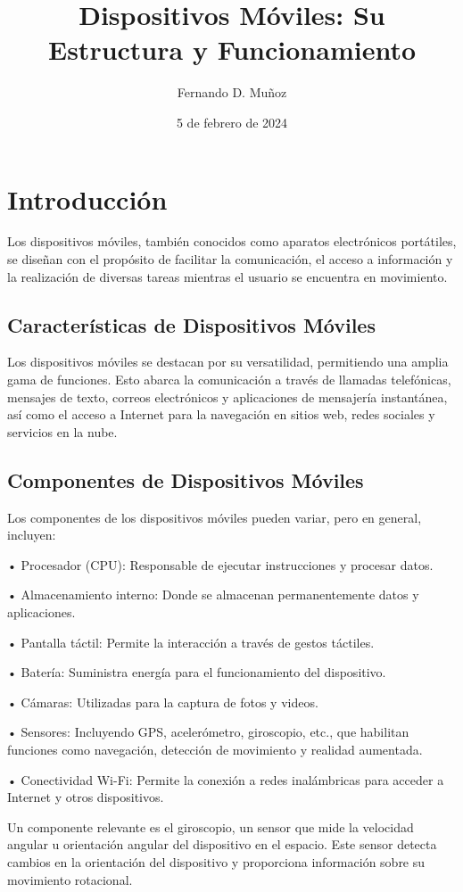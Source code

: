 \documentclass{article}
\title{Dispositivos Móviles: Su Estructura y Funcionamiento}
\author{Fernando D. Muñoz}
\date{5 de febrero de 2024}
\begin{document}
 
		
	\section{Introducción}
	Los dispositivos móviles, también conocidos como aparatos electrónicos portátiles, se diseñan con el propósito de facilitar la comunicación, el acceso a información y la realización de diversas tareas mientras el usuario se encuentra en movimiento.
	
	\subsection{Características de Dispositivos Móviles}
	Los dispositivos móviles se destacan por su versatilidad, permitiendo una amplia gama de funciones. Esto abarca la comunicación a través de llamadas telefónicas, mensajes de texto, correos electrónicos y aplicaciones de mensajería instantánea, así como el acceso a Internet para la navegación en sitios web, redes sociales y servicios en la nube.
	
	\subsection{Componentes de Dispositivos Móviles}
	Los componentes de los dispositivos móviles pueden variar, pero en general, incluyen:
	
	• Procesador (CPU): Responsable de ejecutar instrucciones y procesar datos.
	
	• Almacenamiento interno: Donde se almacenan permanentemente datos y aplicaciones.
	
	• Pantalla táctil: Permite la interacción a través de gestos táctiles.
	
	• Batería: Suministra energía para el funcionamiento del dispositivo.
	
	• Cámaras: Utilizadas para la captura de fotos y videos.
	
	• Sensores: Incluyendo GPS, acelerómetro, giroscopio, etc., que habilitan funciones como navegación, detección de movimiento y realidad aumentada.
	
	• Conectividad Wi-Fi: Permite la conexión a redes inalámbricas para acceder a Internet y otros dispositivos.
	
	Un componente relevante es el giroscopio, un sensor que mide la velocidad angular u orientación angular del dispositivo en el espacio. Este sensor detecta cambios en la orientación del dispositivo y proporciona información sobre su movimiento rotacional.
	
\end{document}
